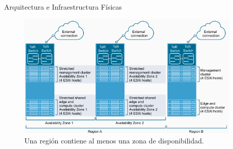 \begin{subsection}{Arquitectura e Infraestructura Físicas \cite{CFfisInfraestuctura}}
\begin{figure}[h!]
  \centering
  \includegraphics[width=0.95\textwidth]{imaxes/conceptosPrevios/zonasDispRegiones.png}
  \caption{Una región contiene al menos una zona de disponibilidad.}
  \label{fig:AVRegiones}
\end{figure}
\fi

\FloatBarrier


\end{subsection}
